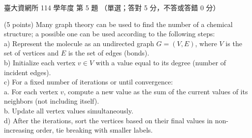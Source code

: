 \begin{pastexam}[label={px:ntu-114-dsa-05}]{臺大資網所 114 學年度 第 5 題}
（單選；答對 5 分，不答或答錯 0 分）

(5 points) Many graph theory can be used to find the number of a chemical structure; a possible one can be used
according to the following steps:\\
a) Represent the molecule as an undirected graph $G=(V,E)$, where $V$ is the set of vertices and $E$ is the set of
edges (bonds).\\
b) Initialize each vertex $v\in V$ with a value equal to its degree (number of incident edges).\\
c) For a fixed number of iterations or until convergence:\\
\hspace*{1em}a. For each vertex $v$, compute a new value as the sum of the current values of its neighbors (not
including itself).\\
\hspace*{1em}b. Update all vertex values simultaneously.\\
d) After the iterations, sort the vertices based on their final values in non-increasing order, tie breaking with
smaller labels.


\end{pastexam}
